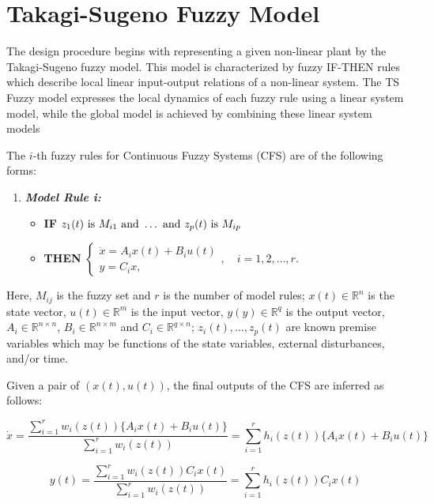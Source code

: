 \section{Takagi-Sugeno Fuzzy Model}

The design procedure begins with representing a given non-linear plant by the Takagi-Sugeno fuzzy model. This model is characterized by fuzzy IF-THEN rules which describe local linear input-output relations of a non-linear system. The TS Fuzzy model expresses the local dynamics of each fuzzy rule using a linear system model, while the global model is achieved by combining these linear system models 

The $i$-th fuzzy rules for Continuous Fuzzy Systems (CFS) are of the following forms:

\begin{enumerate}
  \item[] \textit{\textbf{Model Rule i:}}
  \begin{itemize}
      \item[] \textbf{IF} $z_1(t) \ \mathrm{is}\  M_{i1} \ \mathrm{and}\  \dots \ \mathrm{and}\  z_p(t) \ \mathrm{is}\  M_{ip}$
      \item[] \textbf{THEN} $\begin{cases}
        \dot x = A_i x(t) + B_i u(t) \\
        y = C_i x,
      \end{cases}, \hspace{12pt} i = 1, 2, \dots, r.$
  \end{itemize}
\end{enumerate}

Here, $M_{ij}$ is the fuzzy set and $r$ is the number of model rules; $x(t) \in \mathbb{R}^n$ is the state vector, $u(t) \in \mathbb{R}^m$ is the input vector, $y(y) \in \mathbb{R}^q$ is the output vector, $A_i \in \mathbb{R}^{n\times n}$, $B_i \in \mathbb{R}^{n\times m}$ and $C_i \in \mathbb{R}^{q\times n}$; $z_i(t), \dots, z_p(t)$ are known premise variables which may be functions of the state variables, external disturbances, and/or time.

Given a pair of $(x(t), u(t))$, the final outputs of the CFS are inferred as follows:

\begin{equation}
  \dot x = \frac{\sum\limits_{i=1}^{r} w_i(z(t))\{A_i x(t) + B_i u(t)\}}
  {\sum\limits_{i=1}^{r} w_i(z(t))} =
  \sum\limits_{i=1}^{r} h_i(z(t))\{A_i x(t) + B_i u(t)\}
\end{equation}

\begin{equation}
  y(t) = \frac{\sum\limits_{i=1}^{r} w_i(z(t)) C_i x(t)}
  {\sum\limits_{i=1}^{r} w_i(z(t))} =
  \sum\limits_{i=1}^{r} h_i(z(t))C_i x(t)
\end{equation}

